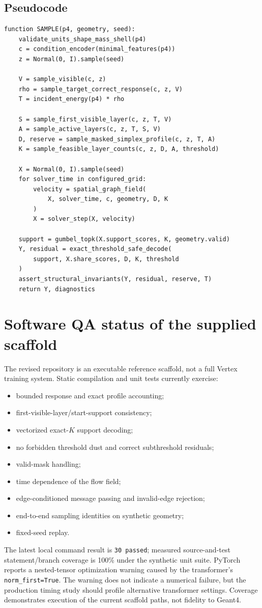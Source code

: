 \documentclass[11pt]{article}
\theoremstyle{definition}
\theoremstyle{remark}
\newcommand{\code}[1]{\texttt{#1}}
\begin{document}
\subsection{Pseudocode}
\begin{lstlisting}
function SAMPLE(p4, geometry, seed):
    validate_units_shape_mass_shell(p4)
    c = condition_encoder(minimal_features(p4))
    z = Normal(0, I).sample(seed)

    V = sample_visible(c, z)
    rho = sample_target_correct_response(c, z, V)
    T = incident_energy(p4) * rho

    S = sample_first_visible_layer(c, z, T, V)
    A = sample_active_layers(c, z, T, S, V)
    D, reserve = sample_masked_simplex_profile(c, z, T, A)
    K = sample_feasible_layer_counts(c, z, D, A, threshold)

    X = Normal(0, I).sample(seed)
    for solver_time in configured_grid:
        velocity = spatial_graph_field(
            X, solver_time, c, geometry, D, K
        )
        X = solver_step(X, velocity)

    support = gumbel_topk(X.support_scores, K, geometry.valid)
    Y, residual = exact_threshold_safe_decode(
        support, X.share_scores, D, K, threshold
    )
    assert_structural_invariants(Y, residual, reserve, T)
    return Y, diagnostics
\end{lstlisting}

\section{Software QA status of the supplied scaffold}
The revised repository is an executable reference scaffold, not a full Vertex training system. Static compilation and unit tests currently exercise:
\begin{itemize}[leftmargin=2em]
  \item bounded response and exact profile accounting;
  \item first-visible-layer/start-support consistency;
  \item vectorized exact-$K$ support decoding;
  \item no forbidden threshold dust and correct subthreshold residuals;
  \item valid-mask handling;
  \item time dependence of the flow field;
  \item edge-conditioned message passing and invalid-edge rejection;
  \item end-to-end sampling identities on synthetic geometry;
  \item fixed-seed replay.
\end{itemize}
The latest local command result is \code{30 passed}; measured source-and-test statement/branch coverage is 100\% under the synthetic unit suite. PyTorch reports a nested-tensor optimization warning caused by the transformer's \code{norm\_first=True}. The warning does not indicate a numerical failure, but the production timing study should profile alternative transformer settings. Coverage demonstrates execution of the current scaffold paths, not fidelity to Geant4.
\end{document}
